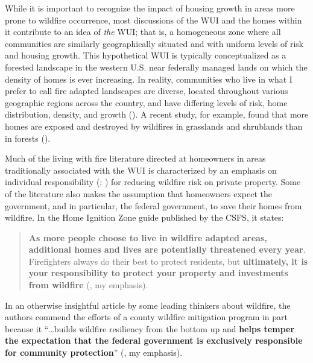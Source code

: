 \documentclass[
]{article}
\begin{document}
While it is important to recognize the impact of housing growth in areas more prone to wildfire occurrence, most discussions of the WUI and the homes within it contribute to an idea of \emph{the} WUI; that is, a homogeneous zone where all communities are similarly geographically situated and with uniform levels of risk and housing growth. This hypothetical WUI is typically conceptualized as a forested landscape in the western U.S. near federally managed lands on which the density of homes is ever increasing. In reality, communities who live in what I prefer to call fire adapted landscapes are diverse, located throughout various geographic regions across the country, and have differing levels of risk, home distribution, density, and growth (). A recent study, for example, found that more homes are exposed and destroyed by wildfires in grasslands and shrublands than in forests ().

Much of the living with fire literature directed at homeowners in areas traditionally associated with the WUI is characterized by an emphasis on individual responsibility (; ) for reducing wildfire risk on private property. Some of the literature also makes the assumption that homeowners expect the government, and in particular, the federal government, to save their homes from wildfire. In the Home Ignition Zone guide published by the CSFS, it states:

\begin{quote}
\textbf{As more people choose to live in wildfire adapted areas, additional homes and lives are potentially threatened every year}. Firefighters always do their best to protect residents, but \textbf{ultimately, it is your responsibility to protect your property and investments from wildfire} (, my emphasis).
\end{quote}

In an otherwise insightful article by some leading thinkers about wildfire, the authors commend the efforts of a county wildfire mitigation program in part because it ``\ldots builds wildfire resiliency from the bottom up and \textbf{helps temper the expectation that the federal government is exclusively responsible for community protection}'' (, my emphasis).
\end{document}
